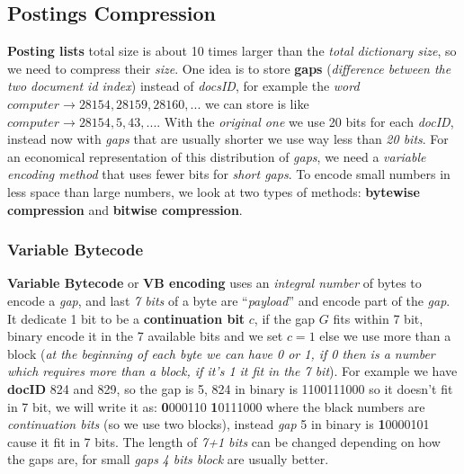 \documentclass{article}
\begin{document}
\subsection{Postings Compression}
\textbf{Posting lists} total size is about 10 times larger than the \emph{total dictionary size}, so we need to compress their \emph{size}. One idea is to store \textbf{gaps} (\emph{difference between the two document id index}) instead of \emph{docsID}, for example the \emph{word} $computer \rightarrow 28154, 28159, 28160, ... $ we can store is like $computer \rightarrow 28154, 5, 43, ... $. With the \emph{original one} we use 20 bits for each \emph{docID}, instead now with \emph{gaps} that are usually shorter we use way less than \emph{20 bits}. For an economical representation of this distribution of \emph{gaps}, we need a \emph{variable encoding method} that uses fewer bits for \emph{short gaps}. To encode small numbers in less space than large numbers, we look at two types of methods: \textbf{bytewise compression} and \textbf{bitwise compression}.
\subsubsection{Variable Bytecode}
\textbf{Variable Bytecode} or \textbf{VB encoding} uses an \emph{integral number} of bytes to encode a \emph{gap}, and last \emph{7 bits} of a byte are “\emph{payload}” and encode part of the \emph{gap}. It dedicate 1 bit to be a \textbf{continuation bit} $c$, if the gap $G$ fits within 7 bit, binary encode it in the 7 available bits and we set $c=1$ else we use more than a block (\emph{at the beginning of each byte we can have 0 or 1, if 0 then is a number which requires more than a block, if it's 1 it fit in the 7 bit}). For example we have \textbf{docID} 824 and 829, so the gap is 5, 824 in binary is 1100111000 so it doesn't fit in 7 bit, we will write it as: \textbf{0}000110 \textbf{1}0111000 where the black numbers are \emph{continuation bits} (so we use two blocks), instead \emph{gap} 5 in binary is \textbf{1}0000101 cause it fit in 7 bits. The length of\emph{ 7+1 bits} can be changed depending on how the gaps are, for small \emph{gaps} \emph{4 bits block} are usually better. 
\end{document}
